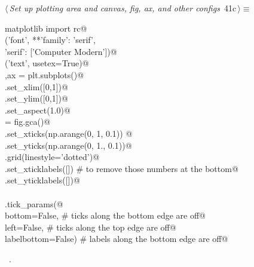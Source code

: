 \documentclass[11.5pt]{report}
\begin{document}
\vspace{-0.8cm}\newchunk 

\begin{flushleft} \small\label{scrap52}\raggedright\small
{} $\langle\,${\itshape Set up plotting area and canvas, fig, ax, and other configs}\nobreak\ {\footnotesize {41c}}$\,\rangle\equiv$
\vspace{-1ex}
\begin{list}{}{} \item
\mbox{}\verb@from matplotlib import rc@\\
\mbox{}\verb@rc('font', **{'family': 'serif', \@\\
\mbox{}\verb@           'serif': ['Computer Modern']})@\\
\mbox{}\verb@rc('text', usetex=True)@\\
\mbox{}\verb@fig,ax = plt.subplots()@\\
\mbox{}\verb@ax.set_xlim([0,1])@\\
\mbox{}\verb@ax.set_ylim([0,1])@\\
\mbox{}\verb@ax.set_aspect(1.0)@\\
\mbox{}\verb@ax = fig.gca()@\\
\mbox{}\verb@ax.set_xticks(np.arange(0, 1, 0.1))     @\\
\mbox{}\verb@ax.set_yticks(np.arange(0, 1., 0.1))@\\
\mbox{}\verb@plt.grid(linestyle='dotted')@\\
\mbox{}\verb@ax.set_xticklabels([]) # to remove those numbers at the bottom@\\
\mbox{}\verb@ax.set_yticklabels([])@\\
\mbox{}\verb@@\\
\mbox{}\verb@ax.tick_params(@\\
\mbox{}\verb@    bottom=False,      # ticks along the bottom edge are off@\\
\mbox{}\verb@    left=False,        # ticks along the top edge are off@\\
\mbox{}\verb@    labelbottom=False) # labels along the bottom edge are off@\\
\mbox{}\verb@@{\NWsep}
\end{list}
\vspace{-1.5ex}
\footnotesize
\begin{list}{}{\setlength{\itemsep}{-\parsep}\setlength{\itemindent}{-\leftmargin}}
\item \NWtxtMacroRefIn\ .

\item{}
\end{list}
\vspace{4ex}
\end{flushleft}
\end{document}
